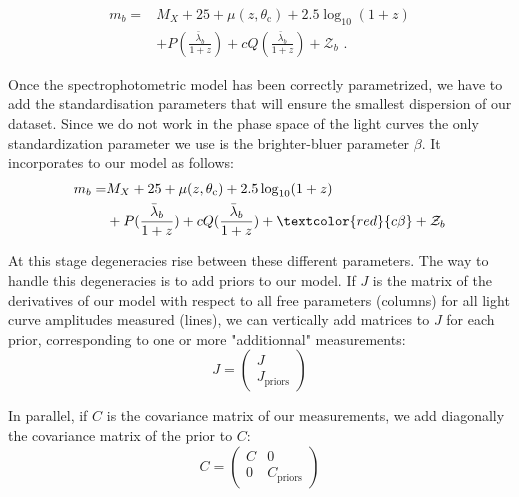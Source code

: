 \documentclass[\docopts]{\docclass}
\begin{document}
\begin{equation}
\begin{split}
m_b = &M_X + 25 + \mu(z, \theta_\text{c}) + 2.5\log_{10}(1+z) \\
&+ P(\frac{\bar\lambda_b }{1+z}) + cQ(\frac{\bar\lambda_b }{1+z})+ \mathcal{Z}_b \text{ .}
\end{split}
\end{equation}

Once the spectrophotometric model has been correctly parametrized, we have to add the standardisation parameters that will ensure the smallest dispersion of our dataset.
Since we do not work in the phase space of the light curves the only standardization parameter we use is the brighter-bluer parameter $\beta$.
It incorporates to our model as follows:
\begin{equation}
\begin{split}
\label{eq::model}
m_b = &M_X + 25 + \mu(z, \theta_\text{c}) + 2.5\log_{10}(1+z) \\
&+ P(\frac{\bar\lambda_b }{1+z}) + cQ(\frac{\bar\lambda_b }{1+z}) + \textcolor{red}{c\beta}+ \mathcal{Z}_b
\end{split}
\end{equation}

At this stage degeneracies rise between these different parameters.
The way to handle this degeneracies is to add priors to our model.
If $J$ is the matrix of the derivatives  of our model with respect to all free parameters (columns) for all light curve amplitudes measured (lines), we can vertically add matrices to $J$ for each prior, corresponding to one or more "additionnal" measurements:
\begin{equation}
J =
\begin{pmatrix}
  J \\
  J_\text{priors}
\end{pmatrix} 
\end{equation}

In parallel, if $C$ is the covariance matrix of our measurements, we add diagonally the covariance matrix of the prior to $C$:
\begin{equation}
C =
\begin{pmatrix}
  C & 0 \\
  0 & C_\text{priors}
\end{pmatrix} 
\end{equation}
\end{document}
